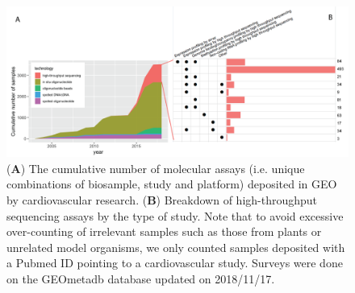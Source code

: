 \documentclass[letter]{bioinfo}
\begin{document}
		
	\begin{figure}[!tpb]
		\includegraphics[width=1\linewidth]{assay-count-cardio}
		\caption{(\textbf{A}) The cumulative number of molecular assays (i.e. unique combinations of biosample, study and platform) deposited in GEO by cardiovascular research. (\textbf{B}) Breakdown of high-throughput sequencing assays by the type of study.  \label{fig:geo-assay} Note that to avoid excessive over-counting of irrelevant samples such as those from plants or unrelated model organisms, we only counted samples deposited with a Pubmed ID pointing to a cardiovascular study. Surveys were done on the GEOmetadb database \citep{Zhu:2008:GEOmetadb} updated on 2018/11/17.}
	\end{figure} 
		    
\end{document}
